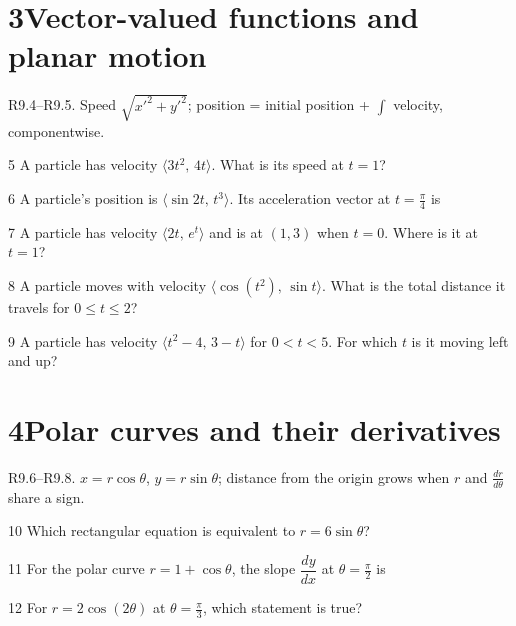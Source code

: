 \documentclass{apcalc}
\begin{document}
\section*{3\quad Vector-valued functions and planar motion}
\begin{setrule}R9.4–R9.5. Speed $\sqrt{x'^2+y'^2}$; position = initial position + $\int$ velocity, componentwise.\end{setrule}
\begin{q}{5}
A particle has velocity $\langle3t^2,\,4t\rangle$. What is its speed at $t=1$?
\end{q}
\begin{q}{6}
A particle's position is $\langle\sin2t,\,t^3\rangle$. Its acceleration vector at $t=\frac\pi4$ is
\end{q}
\begin{q}{7}
A particle has velocity $\langle2t,\,e^t\rangle$ and is at $(1,3)$ when $t=0$. Where is it at $t=1$?
\end{q}
\begin{q}{8}
A particle moves with velocity $\langle\cos(t^2),\,\sin t\rangle$. What is the total distance it travels for $0\le t\le2$?\calcmark
{}
\end{q}
\begin{q}{9}
A particle has velocity $\langle t^2-4,\,3-t\rangle$ for $0<t<5$. For which $t$ is it moving left and up?
\end{q}
\section*{4\quad Polar curves and their derivatives}
\begin{setrule}R9.6–R9.8. $x=r\cos\theta$, $y=r\sin\theta$; distance from the origin grows when $r$ and $\frac{dr}{d\theta}$ share a sign.\end{setrule}
\begin{q}{10}
Which rectangular equation is equivalent to $r=6\sin\theta$?
\end{q}
\begin{q}{11}
For the polar curve $r=1+\cos\theta$, the slope $\dfrac{dy}{dx}$ at $\theta=\frac\pi2$ is
\end{q}
\begin{q}{12}
For $r=2\cos(2\theta)$ at $\theta=\frac\pi3$, which statement is true?
\end{q}
\end{document}
